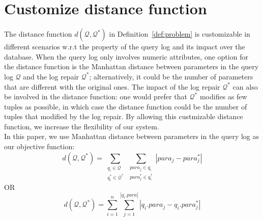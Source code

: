 \section{Customize distance function}


The distance function $d(\mathcal{Q}, \mathcal{Q}^*)$ 
in Definition~\ref{def:problem} is customizable 
in different scenarios w.r.t the property of the query log and its
impact over the database. 
When the query log only involves numeric attributes, one option for 
the distance function is the Manhattan distance between parameters in 
the query log $\mathcal{Q}$ and the log repair $\mathcal{Q}^*$; 
alternatively, it could be the number of 
parameters that are different with the original ones. The
impact of the log repair $\mathcal{Q}^*$ can also be involved 
in the distance function: one would prefer that $\mathcal{Q}^*$
modifies as few tuples as possible, in which case the distance 
function could be the number of tuples that modified by the log repair.
By allowing this custmizable distance function, we increase the flexibility 
of our system. \\
In this paper, we use Manhattan distance between parameters 
in the query log as our objective function: 
\[d(\mathcal{Q}, \mathcal{Q}^*) = \sum\limits_{\substack{ q_i \in \mathcal{Q}\\ q_i^* \in \mathcal{Q}^*}}  
\sum\limits_{\substack{para_j \in q_i\\ para_j^* \in q_i^*}}|para_j - para_j^*|\]
OR
\[d(\mathcal{Q}, \mathcal{Q}^*) = \sum_{i = 1} ^{n} \sum_{j = 1}^{|q_i.para|} |q_i.para_j - q_i.para_j^*|\]
